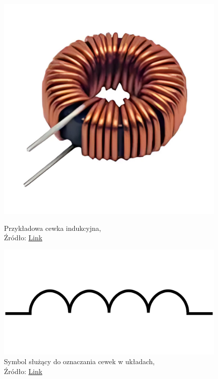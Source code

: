 \documentclass{article}
\begin{document}
        \begin{figure}[!ht]
          \begin{minipage}{.5\textwidth}
              \centering
              \includegraphics[scale=0.045]{grafiki/Cewka.png}
              \caption{Przykładowa cewka indukcyjna,
              \\Źródło: \href{https://pl.farnell.com/productimages/standard/pl_PL/2945407-40.jpg}{Link}}
          \end{minipage}
          \begin{minipage}{.5\textwidth}
              \centering
              \includegraphics[scale=0.085]{grafiki/Cewka_symbol.png}
              \caption{Symbol służący do oznaczania cewek w układach,
              \\Źródło: \href{https://fizyka.uniedu.pl/zwojnica/coil-146521/}{Link}}
          \end{minipage}
        \end{figure}
\end{document}
